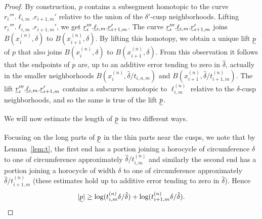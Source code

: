 \documentclass{amsart}
\theoremstyle{definition}
\theoremstyle{remark}
\begin{document}
\begin{proof}
By construction, $p$ contains a subsegment homotopic to the curve $r_{i}''' . \ell_{i,m}.r_{i+1,m}'$ relative to the union of the $\delta'$-cusp neighborhoods.  Lifting $r_{i}''' . \ell_{i,m}.r_{i+1,m}'$, we get $\undertilde{r}_{i}''' . \undertilde{\ell}_{i,m}.\undertilde{r}_{i+1,m}'$. The curve $\undertilde{r}_{i}''' . \undertilde{\ell}_{i,m}.\undertilde{r}_{i+1,m}'$ joins $B(x_{i}^{(n)},\delta)$ to $B(x_{i+1}^{(n)},\delta)$.   By lifting this homotopy, we obtain a unique lift $\undertilde{p}$ of $p$ that also joins $B(x^{(n)}_{i},\delta)$ to $B(x_{i+1}^{(n)},\delta)$.  From this observation it follows that the endpoints of $p$ are, up to an additive error tending to zero in $\hat{\delta}$, actually in the smaller neighborhoods $B(x^{(n)}_{i},\hat{\delta}/t_{i, n, m})$ and $B(x_{i+1}^{(n)},\hat{\delta}/t^{(n)}_{i+1, m})$. The lift $\undertilde{r}_{i}''' . \undertilde{\ell}_{i,m}.\undertilde{r}_{i+1,m}'$ contains a subcurve homotopic to $\ell_{i,m}^{(n)}$ relative to the $\delta$-cusp neighborhoods, and so the same is true of the lift $\undertilde{p}$.  

We will now estimate the length of $\undertilde{p}$ in two different ways. 

Focusing on the long parts of $\undertilde{p}$ in the thin parts near the cusps, we note that by Lemma~\ref{lem:t}, the first end has a portion joining a horocycle of circumference $\delta$ to one of circumference approximately $\hat{\delta}/t^{(n)}_{i,m}$ and similarly the second end has a portion joining a horocycle of width $\delta$ to one of circumference approximately $\hat{\delta}/t^{(n)}_{i+1,m}$ (these estimates hold up to additive error tending to zero in $\hat{\delta}$). Hence 
  \[|\undertilde{p}|\ge\log(t^{(n)}_{i,m}\delta/\hat{\delta})+\log(t^{(n)}_{i+1,m}\delta/\hat{\delta}).\]
  

\end{proof}
\end{document}
